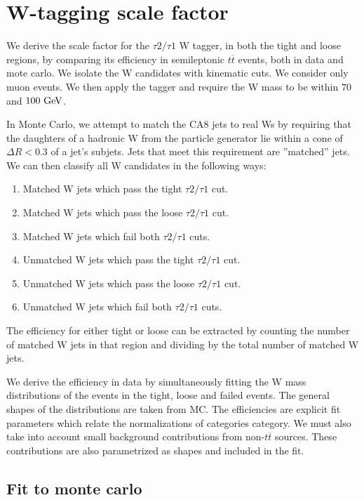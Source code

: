 \clearpage
\section{W-tagging scale factor}

We derive the scale factor for the $\tau 2/\tau 1$ W tagger, in both the tight and loose regions, by
comparing its efficiency in semileptonic $t\overline{t}$ events, both
in data and mote carlo. We isolate the W candidates with kinematic
cuts. We consider only muon events. We then apply the tagger and require the W mass to be within
$70$ and $100~\mathrm{GeV}$.

In Monte Carlo, we attempt to match the CA8 jets to real Ws by
requiring that the daughters of a hadronic W from the particle generator lie within a
cone of $\Delta R < 0.3$ of a jet's subjets. Jets that meet this
requirement are ''matched'' jets. We can then classify all W
candidates in the following ways:
\begin{enumerate}
\item Matched W jets which pass the tight $\tau 2/\tau 1$ cut.
\item Matched W jets which pass the loose $\tau 2/\tau 1$ cut.
\item Matched W jets which fail both $\tau 2/\tau 1$ cuts.
\item Unmatched W jets which pass the tight $\tau 2/\tau 1$ cut.
\item Unmatched W jets which pass the loose $\tau 2/\tau 1$ cut.
\item Unmatched W jets which fail both $\tau 2/\tau 1$ cuts.
\end{enumerate}
The efficiency for either tight or loose can be extracted by counting the number of matched
W jets in that region and dividing by the total number of
matched W jets.

We derive the efficiency in data by simultaneously fitting the
W mass distributions of the events in the tight, loose and failed events. The general shapes of the distributions are taken from MC. The efficiencies are explicit fit parameters which relate the normalizations of categories category. We must also take into account small background contributions from non-$t\overline{t}$ sources. These contributions are also parametrized as shapes and included in the fit.

\subsection{Fit to monte carlo}

